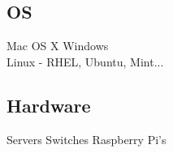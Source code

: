 \documentclass[]{deedy-resume-openfont}
\begin{document}
\begin{minipage}[t]{0.33\textwidth}
\subsection{OS}
Mac OS X \textbullet{}
Windows \\
Linux - RHEL, Ubuntu, Mint... \\

\subsection{Hardware}
Servers \textbullet{}
Switches \textbullet{}
Raspberry Pi's \\


%
%

\end{minipage} 
\hfill
\end{document}
